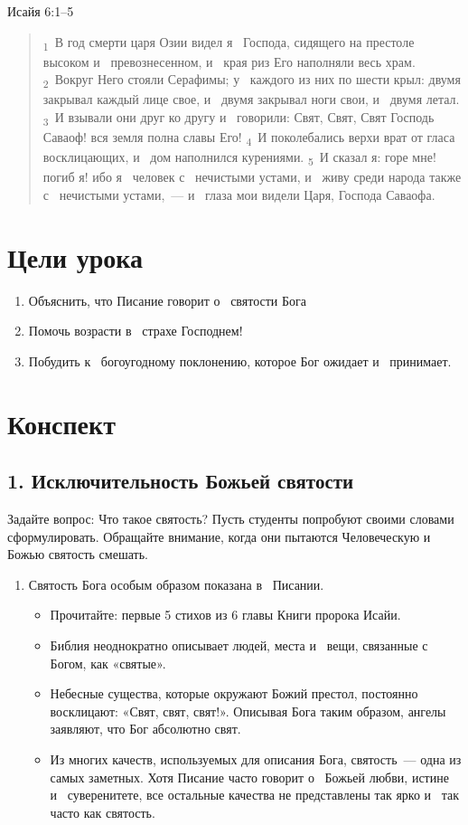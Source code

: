 \documentclass[a4paper,12pt]{article}
\begin{document}
\noindent Исайя 6:1--5

\begin{quote}
\textsubscript{1}~В год смерти царя Озии видел я~ Господа, сидящего на престоле высоком и~ превознесенном, и~ края риз Его наполняли весь храм. 
\textsubscript{2}~Вокруг Него стояли Серафимы; у~ каждого из них по шести крыл: двумя закрывал каждый лице свое, и~ двумя закрывал ноги свои, и~ двумя летал. 
\textsubscript{3}~И взывали они друг ко другу и~ говорили: Свят, Свят, Свят Господь Саваоф! вся земля полна славы Его! 
\textsubscript{4}~И поколебались верхи врат от гласа восклицающих, и~ дом наполнился курениями. 
\textsubscript{5}~И сказал я: горе мне! погиб я! ибо я~ человек с~ нечистыми устами, и~ живу среди народа также с~ нечистыми устами,~--- и~ глаза мои видели Царя, Господа Саваофа. 
\end{quote}

\section*{Цели урока}
\begin{enumerate}
    \item Объяснить, что Писание говорит о~ святости Бога
    \item  Помочь возрасти в~ страхе Господнем!
    \item  Побудить к~ богоугодному поклонению, которое Бог ожидает и~ принимает.
\end{enumerate}

\section*{Конспект}

\subsection{1. Исключительность Божьей святости}

Задайте вопрос: Что такое святость? Пусть студенты попробуют своими словами сформулировать. Обращайте внимание, когда они пытаются Человеческую и~ Божью святость смешать.

\begin{enumerate}
    \item Святость Бога особым образом показана в~ Писании.
    \begin{itemize}
        \item Прочитайте: первые 5 стихов из 6 главы Книги пророка Исайи.
        \item Библия неоднократно описывает людей, места и~ вещи, связанные с~ Богом, как «святые».
        \item Небесные существа, которые окружают Божий престол, постоянно восклицают: «Свят, свят, свят!». Описывая Бога таким образом, ангелы заявляют, что Бог абсолютно свят. 
        \item Из многих качеств, используемых для описания Бога, святость~--- одна из самых заметных. Хотя Писание часто говорит о~ Божьей любви, истине и~ суверенитете, все остальные качества не представлены так ярко и~ так часто как святость.
    \end{itemize}
\end{enumerate}
        
\end{document}

